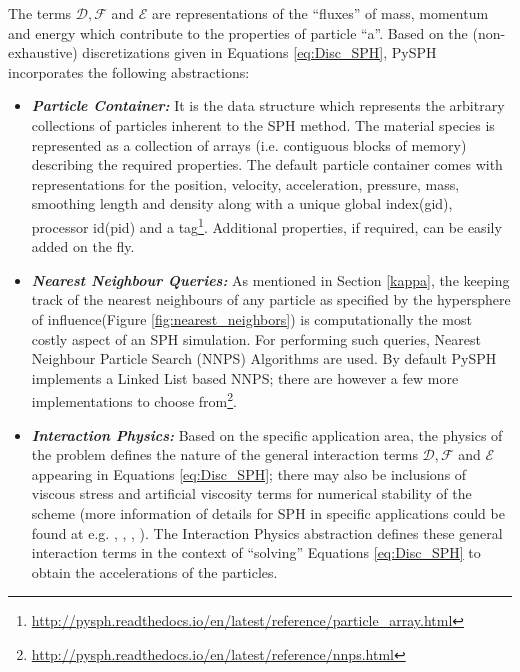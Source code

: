 The terms $\mathcal{D}, \mathcal{F}$ and $\mathcal{E}$ are representations of the ``fluxes'' of mass, momentum and energy which contribute to the properties of particle ``a''. Based on the (non-exhaustive) discretizations given in Equations \eqref{eq:Disc_SPH}, PySPH incorporates the following abstractions:

\begin{itemize}
\item \textbf{\textit{Particle Container: }}It is the data structure which represents the arbitrary collections of particles inherent to the SPH method. The material species is represented as a collection of arrays (i.e. contiguous blocks of memory) describing the required properties. The default particle container comes with representations for the position, velocity, acceleration, pressure, mass, smoothing length and density along with a unique global index(gid), processor id(pid) and a tag\footnote[5]{\url{http://pysph.readthedocs.io/en/latest/reference/particle_array.html}}. Additional properties, if required, can be easily added on the fly. 

\item \textbf{\textit{Nearest Neighbour Queries: }} As mentioned in Section \ref{kappa}, the keeping track of the nearest neighbours of any particle as specified by the hypersphere of influence(Figure \ref{fig:nearest_neighbors}) is computationally the most costly aspect of an SPH simulation. For performing such queries, Nearest Neighbour Particle Search (NNPS) Algorithms are used. By default PySPH implements a Linked List based NNPS; there are however a few more implementations to choose from\footnote[6]{\url{http://pysph.readthedocs.io/en/latest/reference/nnps.html}}.

\item \textbf{\textit{Interaction Physics: }}Based on the specific application area, the physics of the problem defines the nature of the general interaction terms  $\mathcal{D}, \mathcal{F}$ and $\mathcal{E}$ appearing in Equations \ref{eq:Disc_SPH}; there may also be inclusions of viscous stress and artificial viscosity terms for numerical stability of the scheme (more information of details for SPH in specific applications could be found at e.g. \cite{price}, \cite{monaghan_ARFM}, \cite{monaghan_physics},  \cite{volker_springel}). The Interaction Physics abstraction defines these general interaction terms in the context of ``solving'' Equations \ref{eq:Disc_SPH} to obtain the accelerations of the particles.


\end{itemize}
